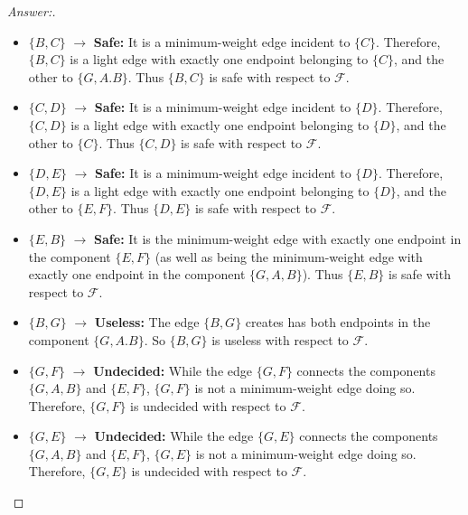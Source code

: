 \documentclass[11pt]{article}
\theoremstyle{definition}
\theoremstyle{definition}
\theoremstyle{definition}
\begin{document}
\begin{proof}[Answer:] \
\begin{itemize}

\item $\{B, C\}$ $\to$ \textbf{Safe:} It is a minimum-weight edge incident to $\{C\}$. Therefore, $\{B, C\}$ is a light edge with exactly one endpoint belonging to $\{C\}$, and the other to $\{G, A. B\}$. Thus $\{B, C\}$ is safe with respect to $\mathcal{F}$.

\item $\{C, D\}$ $\to$ \textbf{Safe:} It is a minimum-weight edge incident to $\{D\}$. Therefore, $\{C, D\}$ is a light edge with exactly one endpoint belonging to $\{D\}$, and the other to $\{C\}$. Thus $\{C, D\}$ is safe with respect to $\mathcal{F}$.

\item $\{D, E\}$ $\to$ \textbf{Safe:} It is a minimum-weight edge incident to $\{D\}$. Therefore, $\{D, E\}$ is a light edge with exactly one endpoint belonging to $\{D\}$, and the other to $\{E, F\}$. Thus $\{D, E\}$ is safe with respect to $\mathcal{F}$.

\item $\{E, B\}$ $\to$ \textbf{Safe:} It is the minimum-weight edge with exactly one endpoint in the component $\{E, F\}$ (as well as  being the minimum-weight edge with exactly one endpoint in the component $\{G, A, B\}$). Thus $\{E, B\}$ is safe with respect to $\mathcal{F}$.

\item $\{B, G\}$ $\to$ \textbf{Useless:} The edge $\{B, G\}$ creates has both endpoints in the component $\{G, A. B\}$. So $\{B, G\}$ is useless with respect to $\mathcal{F}$.

\item $\{G, F\}$ $\to$ \textbf{Undecided:} While the edge $\{G, F\}$ connects the components $\{G, A, B\}$ and $\{E, F\}$, $\{G, F\}$ is not a minimum-weight edge doing so. Therefore, $\{G, F\}$ is undecided with respect to $\mathcal{F}$.

\item $\{G, E\}$ $\to$ \textbf{Undecided:} While the edge $\{G, E\}$ connects the components $\{G, A, B\}$ and $\{E, F\}$, $\{G, E\}$ is not a minimum-weight edge doing so. Therefore, $\{G, E\}$ is undecided with respect to $\mathcal{F}$.

\end{itemize}
\end{proof}
\end{document}
